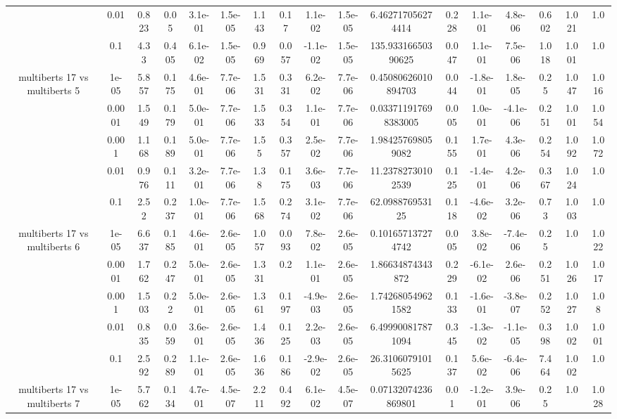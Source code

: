 \begin{tabular}{|c|c|c|c|c|c|c|c|c|c|c|c|c|c|c|c|c|}
 & 0.01 & 0.823 & 0.05 & 3.1e-01 & 1.5e-05 & 1.143 & 0.17 & 1.1e-02 & 1.5e-05 & 6.462717056274414 & 0.228 & 1.1e-01 & 4.8e-06 & 0.602 & 1.021 & 1.0 \\
 & 0.1 & 4.33 & 0.405 & 6.1e-02 & 1.5e-05 & 0.969 & 0.057 & -1.1e-02 & 1.5e-05 & 135.93316650390625 & 0.047 & 1.1e-01 & 7.5e-06 & 1.018 & 1.001 & 1.0 \\
\hline
\multirow{5}{*}{multiberts 17 vs multiberts 5} & 1e-05 & 5.857 & 0.175 & 4.6e-01 & 7.7e-06 & 1.531 & 0.331 & 6.2e-02 & 7.7e-06 & 0.45080626010894703 & 0.044 & -1.8e-01 & 1.8e-05 & 0.25 & 1.047 & 1.016 \\
 & 0.0001 & 1.549 & 0.179 & 5.0e-01 & 7.7e-06 & 1.533 & 0.354 & 1.1e-01 & 7.7e-06 & 0.033711917698383005 & 0.005 & 1.0e-01 & -4.1e-06 & 0.251 & 1.001 & 1.054 \\
 & 0.001 & 1.168 & 0.189 & 5.0e-01 & 7.7e-06 & 1.55 & 0.357 & 2.5e-02 & 7.7e-06 & 1.984257698059082 & 0.155 & 1.7e-01 & 4.3e-06 & 0.254 & 1.092 & 1.072 \\
 & 0.01 & 0.976 & 0.111 & 3.2e-01 & 7.7e-06 & 1.38 & 0.175 & 3.6e-03 & 7.7e-06 & 11.23782730102539 & 0.125 & -1.4e-01 & 4.2e-06 & 0.367 & 1.024 & 1.0 \\
 & 0.1 & 2.52 & 0.237 & 1.0e-01 & 7.7e-06 & 1.568 & 0.274 & 3.1e-02 & 7.7e-06 & 62.098876953125 & 0.118 & -4.6e-02 & 3.2e-06 & 0.73 & 1.003 & 1.0 \\
\hline
\multirow{5}{*}{multiberts 17 vs multiberts 6} & 1e-05 & 6.637 & 0.185 & 4.6e-01 & 2.6e-05 & 1.057 & 0.093 & 7.8e-02 & 2.6e-05 & 0.101657137274742 & 0.005 & 3.8e-02 & -7.4e-06 & 0.25 & 1.0 & 1.022 \\
 & 0.0001 & 1.762 & 0.247 & 5.0e-01 & 2.6e-05 & 1.331 & 0.2 & 1.1e-01 & 2.6e-05 & 1.86634874343872 & 0.229 & -6.1e-02 & 2.6e-06 & 0.251 & 1.026 & 1.017 \\
 & 0.001 & 1.503 & 0.22 & 5.0e-01 & 2.6e-05 & 1.361 & 0.197 & -4.9e-03 & 2.6e-05 & 1.742680549621582 & 0.133 & -1.6e-01 & -3.8e-07 & 0.252 & 1.027 & 1.08 \\
 & 0.01 & 0.835 & 0.059 & 3.6e-01 & 2.6e-05 & 1.436 & 0.125 & 2.2e-03 & 2.6e-05 & 6.499900817871094 & 0.345 & -1.3e-02 & -1.1e-05 & 0.398 & 1.002 & 1.001 \\
 & 0.1 & 2.592 & 0.289 & 1.1e-01 & 2.6e-05 & 1.636 & 0.186 & -2.9e-02 & 2.6e-05 & 26.31060791015625 & 0.137 & 5.6e-02 & -6.4e-06 & 7.464 & 1.002 & 1.0 \\
\hline
\multirow{5}{*}{multiberts 17 vs multiberts 7} & 1e-05 & 5.762 & 0.134 & 4.7e-01 & 4.5e-07 & 2.211 & 0.492 & 6.1e-02 & 4.5e-07 & 0.07132074236869801 & 0.01 & -1.2e-01 & 3.9e-06 & 0.25 & 1.0 & 1.028 \\

\end{tabular}
